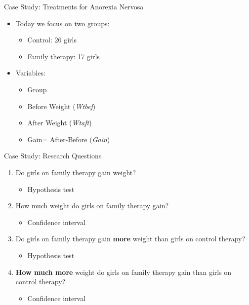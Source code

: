 \documentclass[
  ignorenonframetext,
  aspectratio=32,
]{beamer}
\providecommand{\tightlist}{%
  \setlength{\itemsep}{0pt}\setlength{\parskip}{0pt}}\usepackage{longtable,booktabs,array}
\begin{document}
\begin{frame}{Case Study: Treatments for Anorexia Nervosa}
\protect\hypertarget{case-study-treatments-for-anorexia-nervosa-1}{}
\begin{itemize}
\tightlist
\item
  Today we focus on two groups:

  \begin{itemize}
  \tightlist
  \item
    Control: 26 girls
  \item
    Family therapy: 17 girls
  \end{itemize}
\item
  Variables:

  \begin{itemize}
  \tightlist
  \item
    Group\\
  \item
    Before Weight (\emph{Wtbef})\\
  \item
    After Weight (\emph{Wtaft})\\
  \item
    Gain= After-Before (\emph{Gain})
  \end{itemize}
\end{itemize}
\end{frame}

\begin{frame}{Case Study: Research Questions}
\protect\hypertarget{case-study-research-questions}{}
\begin{enumerate}
\tightlist
\item
  Do girls on family therapy gain weight?

  \begin{itemize}
  \tightlist
  \item
    Hypothesis test
  \end{itemize}
\item
  How much weight do girls on family therapy gain?

  \begin{itemize}
  \tightlist
  \item
    Confidence interval
  \end{itemize}
\item
  Do girls on family therapy gain \textbf{more} weight than girls on
  control therapy?

  \begin{itemize}
  \tightlist
  \item
    Hypothesis test
  \end{itemize}
\item
  \textbf{How much more} weight do girls on family therapy gain than
  girls on control therapy?

  \begin{itemize}
  \tightlist
  \item
    Confidence interval
  \end{itemize}
\end{enumerate}
\end{frame}
\end{document}
